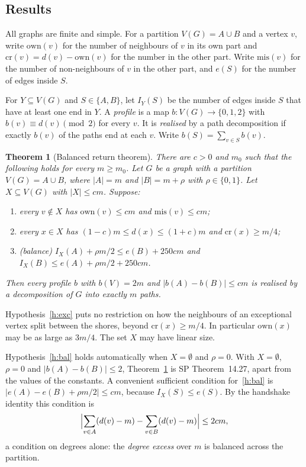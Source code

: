 \documentclass[11pt]{article}
\newtheorem{theorem}{Theorem}[section]
\theoremstyle{definition}
\newcommand{\own}{\mathrm{own}}
\newcommand{\cro}{\mathrm{cr}}
\newcommand{\mis}{\mathrm{mis}}
\begin{document}
\subsection{Results}
All graphs are finite and simple. For a partition $V(G)=A\cup B$ and a vertex $v$, write $\own(v)$ for the number of neighbours of $v$ in its own part and $\cro(v)=d(v)-\own(v)$ for the number in the other part. Write $\mis(v)$ for the number of non-neighbours of $v$ in the other part, and $e(S)$ for the number of edges inside $S$.

For $Y\subseteq V(G)$ and $S\in\{A,B\}$, let $I_Y(S)$ be the number of edges inside $S$ that have at least one end in $Y$. A \emph{profile} is a map $b:V(G)\to\{0,1,2\}$ with $b(v)\equiv d(v)\pmod 2$ for every $v$. It is \emph{realised} by a path decomposition if exactly $b(v)$ of the paths end at each $v$. Write $b(S)=\sum_{v\in S}b(v)$.

\begin{theorem}[Balanced return theorem]\label{thm:main}
There are $c>0$ and $m_0$ such that the following holds for every $m\ge m_0$. Let $G$ be a graph with a partition $V(G)=A\cup B$, where $|A|=m$ and $|B|=m+\rho$ with $\rho\in\{0,1\}$. Let $X\subseteq V(G)$ with $|X|\le cm$. Suppose:
\begin{enumerate}[label=\textup{(\alph*)},nosep]
\item\label{h:healthy} every $v\notin X$ has $\own(v)\le cm$ and $\mis(v)\le cm$;
\item\label{h:exc} every $x\in X$ has $(1-c)m\le d(x)\le(1+c)m$ and $\cro(x)\ge m/4$;
\item\label{h:bal} \emph{(balance)} $I_X(A)+\rho m/2\le e(B)+250cm$ and $I_X(B)\le e(A)+\rho m/2+250cm$.
\end{enumerate}
Then every profile $b$ with $b(V)=2m$ and $|b(A)-b(B)|\le cm$ is realised by a decomposition of $G$ into exactly $m$ paths.
\end{theorem}

Hypothesis~\ref{h:exc} puts no restriction on how the neighbours of an exceptional vertex split between the shores, beyond $\cro(x)\ge m/4$. In particular $\own(x)$ may be as large as $3m/4$. The set $X$ may have linear size.

Hypothesis~\ref{h:bal} holds automatically when $X=\emptyset$ and $\rho=0$. With $X=\emptyset$, $\rho=0$ and $|b(A)-b(B)|\le 2$, Theorem~\ref{thm:main} is SP Theorem~14.27, apart from the values of the constants. A convenient sufficient condition for~\ref{h:bal} is $|e(A)-e(B)+\rho m/2|\le cm$, because $I_X(S)\le e(S)$. By the handshake identity this condition is
\begin{equation}\label{eq:excess}
\Bigl|\sum_{v\in A}(d(v)-m)-\sum_{v\in B}(d(v)-m)\Bigr|\le 2cm,
\end{equation}
a condition on degrees alone: the \emph{degree excess} over $m$ is balanced across the partition.
\end{document}
